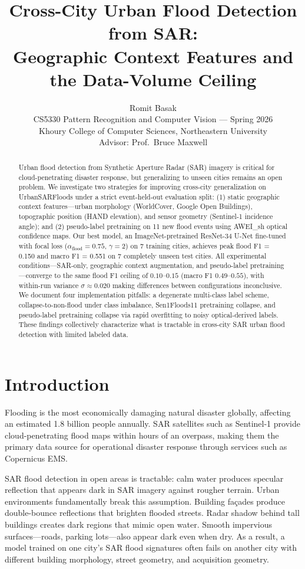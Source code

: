 \documentclass[10pt,twocolumn]{article}
\title{\textbf{Cross-City Urban Flood Detection from SAR:\\
       Geographic Context Features and the Data-Volume Ceiling}}
\author{Romit Basak\\
  \small CS5330 Pattern Recognition and Computer Vision --- Spring 2026\\
  \small Khoury College of Computer Sciences, Northeastern University\\
  \small Advisor: Prof.\ Bruce Maxwell}
\date{}
\begin{document}
\maketitle

\begin{abstract}
Urban flood detection from Synthetic Aperture Radar (SAR) imagery is
critical for cloud-penetrating disaster response, but generalizing to
unseen cities remains an open problem.  We investigate two strategies
for improving cross-city generalization on UrbanSARFloods under a strict
event-held-out evaluation split: (1) static geographic context
features---urban morphology (WorldCover, Google Open Buildings),
topographic position (HAND elevation), and sensor geometry
(Sentinel-1 incidence angle); and (2) pseudo-label pretraining on
11 new flood events using AWEI\_sh optical confidence maps.
Our best model, an ImageNet-pretrained ResNet-34 U-Net fine-tuned
with focal loss ($\alpha_{\text{flood}}=0.75$, $\gamma=2$) on 7
training cities, achieves peak flood F1 = 0.150 and macro F1 = 0.551
on 7 completely unseen test cities.
All experimental conditions---SAR-only, geographic context augmentation,
and pseudo-label pretraining---converge to the same flood F1 ceiling of
$0.10$--$0.15$ (macro F1 $0.49$--$0.55$), with within-run variance
$\sigma \approx 0.020$ making differences between configurations
inconclusive.
We document four implementation pitfalls: a degenerate multi-class label
scheme, collapse-to-non-flood under class imbalance, Sen1Floods11
pretraining collapse, and pseudo-label pretraining collapse via rapid
overfitting to noisy optical-derived labels.
These findings collectively characterize what is tractable in cross-city
SAR urban flood detection with limited labeled data.
\end{abstract}

\section{Introduction}

Flooding is the most economically damaging natural disaster globally,
affecting an estimated 1.8 billion people annually.  SAR satellites
such as Sentinel-1 provide cloud-penetrating flood maps within hours
of an overpass, making them the primary data source for operational
disaster response through services such as Copernicus EMS.

SAR flood detection in open areas is tractable: calm water produces
specular reflection that appears dark in SAR imagery against rougher
terrain.  Urban environments fundamentally break this assumption.
Building fa\c{c}ades produce double-bounce reflections that brighten
flooded streets.  Radar shadow behind tall buildings creates dark
regions that mimic open water.  Smooth impervious surfaces---roads,
parking lots---also appear dark even when dry.  As a result, a model
trained on one city's SAR flood signatures often fails on another city
with different building morphology, street geometry, and acquisition
geometry.
\end{document}
